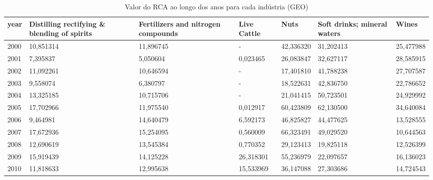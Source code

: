 \begin{table}
\centering
\caption{Valor do RCA ao longo dos anos para cada indústria (GEO)}
\begin{tabular}{p{1cm}p{2cm}p{2cm}p{2cm}p{2cm}p{2cm}p{2cm}}
\toprule
 year &  Distilling rectifying \& blending of spirits &  Fertilizers and nitrogen compounds &  Live Cattle &      Nuts &  Soft drinks; mineral waters &     Wines \\
\midrule
 2000 &                                    10,851314 &                           11,896745 &            - & 42,336320 &                    31,202413 & 25,477988 \\
 2001 &                                     7,395837 &                            5,050604 &     0,023465 & 26,083847 &                    32,627117 & 28,585915 \\
 2002 &                                    11,092261 &                           10,646594 &            - & 17,401810 &                    41,788238 & 27,707587 \\
 2003 &                                     9,558074 &                            6,380797 &            - & 18,522631 &                    42,836750 & 22,786652 \\
 2004 &                                    13,325185 &                           10,715706 &            - & 21,041415 &                    50,723501 & 24,929992 \\
 2005 &                                    17,702966 &                           11,975540 &     0,012917 & 60,423809 &                    62,130500 & 34,640084 \\
 2006 &                                     9,464981 &                           14,640479 &     6,592173 & 46,825827 &                    44,477625 & 13,528555 \\
 2007 &                                    17,672936 &                           15,254095 &     0,560009 & 66,323491 &                    49,029520 & 10,644563 \\
 2008 &                                    12,690619 &                           13,545384 &     0,770352 & 29,123413 &                    19,825118 & 12,526399 \\
 2009 &                                    15,919439 &                           14,125228 &    26,318301 & 55,236979 &                    22,097657 & 16,136023 \\
 2010 &                                    11,818633 &                           12,995638 &    15,533969 & 36,147088 &                    27,303686 & 14,724543 \\

\end{tabular}
\end{table}
